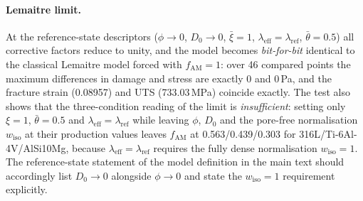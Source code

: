 \documentclass[12pt,a4paper,twocolumn]{article}
\begin{document}
\paragraph{Lemaitre limit.} At the reference-state descriptors ($\phi \to 0$, $D_0 \to 0$, $\bar\xi = 1$,
$\lambda_{\mathrm{eff}} = \lambda_{\mathrm{ref}}$, $\bar\theta = 0.5$) all corrective factors reduce to
unity, and the model becomes \emph{bit-for-bit} identical to the classical Lemaitre model forced with
$f_{\mathrm{AM}} = 1$: over 46 compared points the maximum differences in damage and stress are exactly
$0$ and $0$\,Pa, and the fracture strain (0.08957) and UTS (733.03\,MPa) coincide exactly. The test also
shows that the three-condition reading of the limit is \emph{insufficient}: setting only $\xi = 1$,
$\bar\theta = 0.5$ and $\lambda_{\mathrm{eff}} = \lambda_{\mathrm{ref}}$ while leaving $\phi$, $D_0$ and
the pore-free normalisation $w_{\mathrm{iso}}$ at their production values leaves $f_{\mathrm{AM}}$ at
0.563/0.439/0.303 for 316L/Ti-6Al-4V/AlSi10Mg, because $\lambda_{\mathrm{eff}} = \lambda_{\mathrm{ref}}$
requires the fully dense normalisation $w_{\mathrm{iso}} = 1$. The reference-state statement of the model
definition in the main text should accordingly list $D_0 \to 0$ alongside $\phi \to 0$ and state
the $w_{\mathrm{iso}} = 1$ requirement explicitly.
\end{document}
